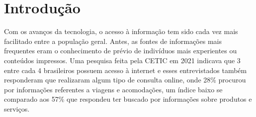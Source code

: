 
\chapter[Introdução]{Introdução}
\label{cap:intro}

\begin{comment}
Neste capítulo precisamos:
\begin{itemize}
    \item Introduzir o contexto
    \item Definir o que entendemos como avaliação de hotéis
    \item Apresentar em linhas gerais quais métodos são usados para detectar fake news, qual o estado da arte atual e quais são suas limitações.
    \item Descrever a nossa proposta e objetivos
    \item Descrever a estrutura do relatório.
\end{itemize}

\end{comment}

Com os avanços da tecnologia, o acesso à informação tem sido cada vez mais facilitado entre a população geral. Antes, as fontes de informações mais frequentes eram o conhecimento de prévio de indivíduos mais experientes ou conteúdos impressos. Uma pesquisa feita pela CETIC em 2021 indicava que 3 entre cada 4 brasileiros possuem acesso à internet e esses entrevistados também responderam que realizaram algum tipo de consulta online, onde 28\% procurou por informações referentes a viagens e acomodações, um índice baixo se comparado aos 57\% que respondeu ter buscado por informações sobre produtos e serviços.


